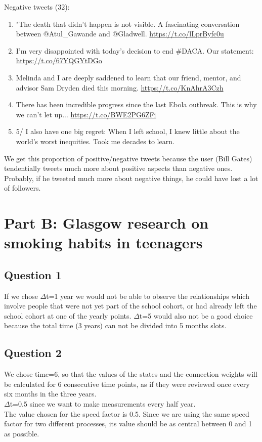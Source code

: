 \documentclass[a4paper]{article}
\begin{document}
Negative tweets (32):

\begin{enumerate}
\item "The death that didn't happen is not visible. A fascinating conversation between @Atul\_Gawande and @Gladwell. \url{https://t.co/lLprByfc0u}
\item I'm very disappointed with today's decision to end \#DACA. Our statement: \url{https://t.co/67YQGYtDGo}
\item Melinda and I are deeply saddened to learn that our friend, mentor, and advisor Sam Dryden died this morning. \url{https://t.co/KnAhrA3Czh}
\item There has been incredible progress since the last Ebola outbreak. This is why we can't let up... \url{https://t.co/BWE2PG6ZFi}
\item 5/ I also have one big regret: When I left school, I knew little about the world's worst inequities. Took me decades to learn.
\end{enumerate}

We get this proportion of positive/negative tweets because the user (Bill Gates) tendentially tweets much more about positive aspects than negative ones. Probably, if he tweeted much more about negative things, he could have lost a lot of followers.

\section{Part B: Glasgow research on smoking habits in teenagers}

\subsection{Question 1}

If we chose $\Delta$t=1 year we would not be able to observe the relationships which involve people that were not yet part of the school cohort, or had already left the school cohort at one of the yearly points. 
$\Delta$t=5 would also not be a good choice because the total time (3 years) can not be divided into 5 months slots. 

\subsection{Question 2}

We chose time=6, so that the values of the states and the connection weights will be calculated for 6 consecutive time points, as if they were reviewed once every six months in the three years.\\
$\Delta$t=0.5 since we want to make measurements every half year.\\
The value chosen for the speed factor is 0.5. Since we are using the same speed factor for two different processes, its value should be as central between 0 and 1 as possible.
\end{document}
